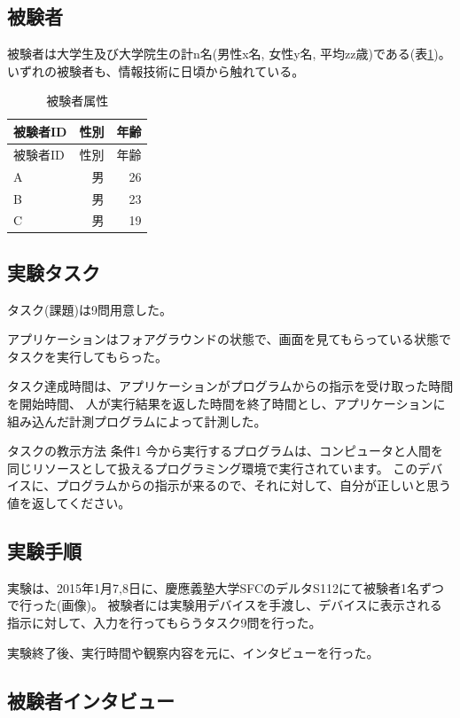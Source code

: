 \subsection{被験者}\label{ux88abux9a13ux8005}

被験者は大学生及び大学院生の計n名(男性x名, 女性y名,
平均zz歳)である(表\ref{table:tester})。
いずれの被験者も、情報技術に日頃から触れている。

\begin{longtable}[c]{@{}lrr@{}}
\caption{被験者属性 \label{table:tester}}\tabularnewline
\toprule
被験者ID & 性別 & 年齢\tabularnewline
\midrule
\endfirsthead
\toprule
被験者ID & 性別 & 年齢\tabularnewline
\midrule
\endhead
A & 男 & 26\tabularnewline
B & 男 & 23\tabularnewline
C & 男 & 19\tabularnewline
\bottomrule
\end{longtable}

\subsection{実験タスク}\label{ux5b9fux9a13ux30bfux30b9ux30af}

タスク(課題)は9問用意した。

アプリケーションはフォアグラウンドの状態で、画面を見てもらっている状態でタスクを実行してもらった。

タスク達成時間は、アプリケーションがプログラムからの指示を受け取った時間を開始時間、
人が実行結果を返した時間を終了時間とし、アプリケーションに組み込んだ計測プログラムによって計測した。

タスクの教示方法 条件1
今から実行するプログラムは、コンピュータと人間を同じリソースとして扱えるプログラミング環境で実行されています。
このデバイスに、プログラムからの指示が来るので、それに対して、自分が正しいと思う値を返してください。

\subsection{実験手順}\label{ux5b9fux9a13ux624bux9806}

実験は、2015年1月7,8日に、慶應義塾大学SFCのデルタS112にて被験者1名ずつで行った(画像)。
被験者には実験用デバイスを手渡し、デバイスに表示される指示に対して、入力を行ってもらうタスク9問を行った。

実験終了後、実行時間や観察内容を元に、インタビューを行った。

\subsection{被験者インタビュー}\label{ux88abux9a13ux8005ux30a4ux30f3ux30bfux30d3ux30e5ux30fc}

